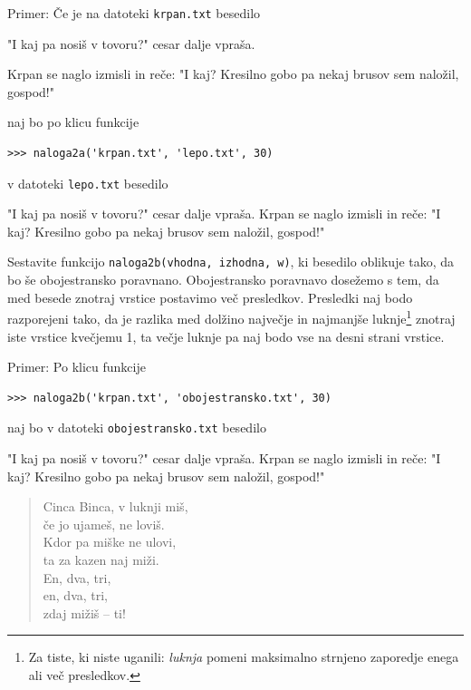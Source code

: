 \documentclass[arhiv]{izpit}
\begin{document}
Primer: Če je na datoteki \texttt{krpan.txt} besedilo
%
\begin{verbatim*}
"I kaj
pa nosiš v
  tovoru?" cesar dalje vpraša.

Krpan se naglo izmisli in reče: "I kaj? Kresilno gobo pa nekaj brusov
sem naložil, gospod!"
\end{verbatim*}
%
naj bo po klicu funkcije
%
\begin{verbatim}
>>> naloga2a('krpan.txt', 'lepo.txt', 30)
\end{verbatim}
%
v datoteki \texttt{lepo.txt} besedilo
%
\begin{verbatim*}
"I kaj pa nosiš v tovoru?"
cesar dalje vpraša. Krpan se
naglo izmisli in reče: "I kaj?
Kresilno gobo pa nekaj brusov
sem naložil, gospod!"
\end{verbatim*}
%
\podnaloga[15 točk] Sestavite funkcijo \texttt{naloga2b(vhodna, izhodna, w)}, ki besedilo oblikuje tako, da bo še
obojestransko poravnano. Obojestransko poravnavo dosežemo s tem, da med besede znotraj vrstice postavimo več presledkov. Presledki
naj bodo razporejeni tako, da je razlika med dolžino največje in najmanjše luknje\footnote{Za tiste, ki niste uganili:
\emph{luknja} pomeni maksimalno strnjeno zaporedje enega ali več presledkov.} znotraj iste vrstice kvečjemu 1,
ta večje luknje pa naj bodo vse na desni strani vrstice.

Primer: Po klicu funkcije
%
\begin{verbatim}
>>> naloga2b('krpan.txt', 'obojestransko.txt', 30)
\end{verbatim}
%
naj bo v datoteki \texttt{obojestransko.txt} besedilo
%
\begin{verbatim*}
"I kaj  pa  nosiš  v  tovoru?"
cesar dalje vpraša.  Krpan  se
naglo izmisli in reče: "I kaj?
Kresilno gobo pa nekaj  brusov
sem     naložil,      gospod!"
\end{verbatim*}


\begin{verse}
Cinca Binca, v luknji miš,\\
če jo ujameš, ne loviš.\\
Kdor pa miške ne ulovi,\\
ta za kazen naj miži.\\
En, dva, tri,\\
en, dva, tri,\\
zdaj mižiš -- ti!
\end{verse}
\end{document}
